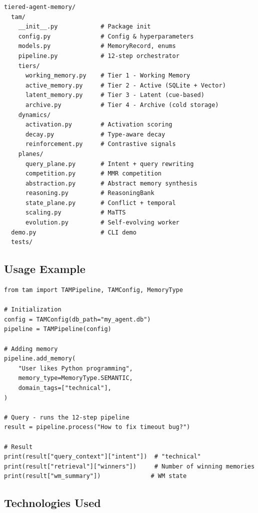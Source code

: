 \documentclass[a4paper,12pt]{article}
\begin{document}
\begin{lstlisting}[language={},basicstyle=\ttfamily\footnotesize]
tiered-agent-memory/
  tam/
    __init__.py            # Package init
    config.py              # Config & hyperparameters
    models.py              # MemoryRecord, enums
    pipeline.py            # 12-step orchestrator
    tiers/
      working_memory.py    # Tier 1 - Working Memory
      active_memory.py     # Tier 2 - Active (SQLite + Vector)
      latent_memory.py     # Tier 3 - Latent (cue-based)
      archive.py           # Tier 4 - Archive (cold storage)
    dynamics/
      activation.py        # Activation scoring
      decay.py             # Type-aware decay
      reinforcement.py     # Contrastive signals
    planes/
      query_plane.py       # Intent + query rewriting
      competition.py       # MMR competition
      abstraction.py       # Abstract memory synthesis
      reasoning.py         # ReasoningBank
      state_plane.py       # Conflict + temporal
      scaling.py           # MaTTS
      evolution.py         # Self-evolving worker
  demo.py                  # CLI demo
  tests/
\end{lstlisting}

\subsection*{Usage Example}

\begin{lstlisting}[caption={TAM Pipeline Initialization and Query}]
from tam import TAMPipeline, TAMConfig, MemoryType

# Initialization
config = TAMConfig(db_path="my_agent.db")
pipeline = TAMPipeline(config)

# Adding memory
pipeline.add_memory(
    "User likes Python programming",
    memory_type=MemoryType.SEMANTIC,
    domain_tags=["technical"],
)

# Query - runs the 12-step pipeline
result = pipeline.process("How to fix timeout bug?")

# Result
print(result["query_context"]["intent"])  # "technical"
print(result["retrieval"]["winners"])     # Number of winning memories
print(result["wm_summary"])              # WM state
\end{lstlisting}

\subsection*{Technologies Used}
\end{document}
